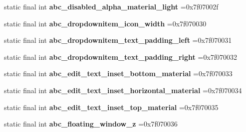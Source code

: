 \begin{DoxyCompactItemize}
\item 
\hypertarget{classcheck_1_1test_1_1_r_1_1dimen_ac34fb910229238b3fc81b9228bd47c8a}{}static final int {\bfseries abc\+\_\+disabled\+\_\+alpha\+\_\+material\+\_\+light} =0x7f07002f\label{classcheck_1_1test_1_1_r_1_1dimen_ac34fb910229238b3fc81b9228bd47c8a}

\item 
\hypertarget{classcheck_1_1test_1_1_r_1_1dimen_aa3476282262ec7f790b858318265604b}{}static final int {\bfseries abc\+\_\+dropdownitem\+\_\+icon\+\_\+width} =0x7f070030\label{classcheck_1_1test_1_1_r_1_1dimen_aa3476282262ec7f790b858318265604b}

\item 
\hypertarget{classcheck_1_1test_1_1_r_1_1dimen_af2e52335b04aa0a96af7b6055d5104fd}{}static final int {\bfseries abc\+\_\+dropdownitem\+\_\+text\+\_\+padding\+\_\+left} =0x7f070031\label{classcheck_1_1test_1_1_r_1_1dimen_af2e52335b04aa0a96af7b6055d5104fd}

\item 
\hypertarget{classcheck_1_1test_1_1_r_1_1dimen_a8683b53f94282cf1e57f084609336d4a}{}static final int {\bfseries abc\+\_\+dropdownitem\+\_\+text\+\_\+padding\+\_\+right} =0x7f070032\label{classcheck_1_1test_1_1_r_1_1dimen_a8683b53f94282cf1e57f084609336d4a}

\item 
\hypertarget{classcheck_1_1test_1_1_r_1_1dimen_a43ec4dae01b1a457a506fbc46ea5e69f}{}static final int {\bfseries abc\+\_\+edit\+\_\+text\+\_\+inset\+\_\+bottom\+\_\+material} =0x7f070033\label{classcheck_1_1test_1_1_r_1_1dimen_a43ec4dae01b1a457a506fbc46ea5e69f}

\item 
\hypertarget{classcheck_1_1test_1_1_r_1_1dimen_a6a50e2d292aeb61ecd5a02c6e28877d3}{}static final int {\bfseries abc\+\_\+edit\+\_\+text\+\_\+inset\+\_\+horizontal\+\_\+material} =0x7f070034\label{classcheck_1_1test_1_1_r_1_1dimen_a6a50e2d292aeb61ecd5a02c6e28877d3}

\item 
\hypertarget{classcheck_1_1test_1_1_r_1_1dimen_ab65239ad79d10099078b715a65bad01a}{}static final int {\bfseries abc\+\_\+edit\+\_\+text\+\_\+inset\+\_\+top\+\_\+material} =0x7f070035\label{classcheck_1_1test_1_1_r_1_1dimen_ab65239ad79d10099078b715a65bad01a}

\item 
\hypertarget{classcheck_1_1test_1_1_r_1_1dimen_a8f5dd645ba54544a00d395d6f60c5e9e}{}static final int {\bfseries abc\+\_\+floating\+\_\+window\+\_\+z} =0x7f070036\label{classcheck_1_1test_1_1_r_1_1dimen_a8f5dd645ba54544a00d395d6f60c5e9e}


\end{DoxyCompactItemize}
